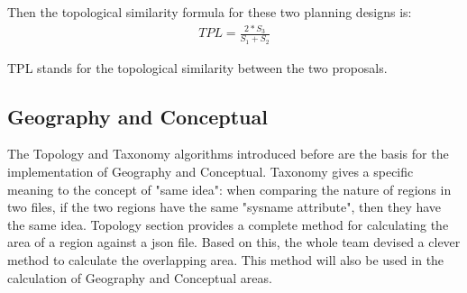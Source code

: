 Then the topological similarity formula for these two planning designs is:
\begin{equation}
\begin{split}
TPL=\frac{2*S_{3} }{S_{1}+S_{2}  } 
\end{split}
\end{equation}

TPL stands for the topological similarity between the two proposals. 

\subsection*{Geography and Conceptual}
The Topology and Taxonomy algorithms introduced before are the basis for the implementation of Geography and Conceptual. Taxonomy gives a specific meaning to the concept of "same idea": when comparing the nature of regions in two files, if the two regions have the same "sysname attribute", then they have the same idea. Topology section provides a complete method for calculating the area of a region against a json file. Based on this, the whole team devised a clever method to calculate the overlapping area. This method will also be used in the calculation of Geography and Conceptual areas.

